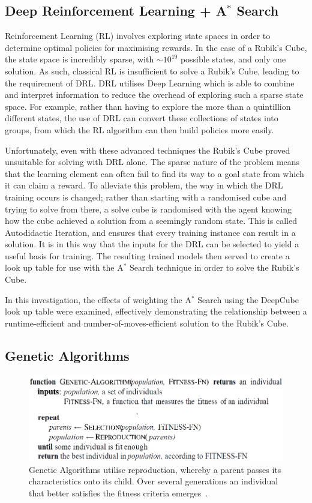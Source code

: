 \documentclass[UKenglish]{svproc}
\begin{document}
\subsection{Deep Reinforcement Learning + A$^{\ast}$ Search}
Reinforcement Learning (RL) involves exploring state spaces in order to determine optimal policies for maximising rewards. In the case of a Rubik's Cube, the state space is incredibly sparse, with $\sim 10^{19}$ possible states, and only one solution. As such, classical RL is insufficient to solve a Rubik's Cube, leading to the requirement of DRL. DRL utilises Deep Learning which is able to combine and interpret information to reduce the overhead of exploring such a sparse state space. For example, rather than having to explore the more than a quintillion different states, the use of DRL can convert these collections of states into groups, from which the RL algorithm can then build policies more easily. \par Unfortunately, even with these advanced techniques the Rubik's Cube proved unsuitable for solving with DRL alone. The sparse nature of the problem means that the learning element can often fail to find its way to a goal state from which it can claim a reward. To alleviate this problem, the way in which the DRL training occurs is changed; rather than starting with a randomised cube and trying to solve from there, a solve cube is randomised with the agent knowing how the cube achieved a solution from a seemingly random state. This is called Autodidactic Iteration, and ensures that every training instance can result in a solution. It is in this way that the inputs for the DRL can be selected to yield a useful basis for training. The resulting trained models then served to create a look up table for use with the A$^{\ast}$ Search technique in order to solve the Rubik's Cube. \par In this investigation, the effects of weighting the A$^{\ast}$ Search using the DeepCube look up table were examined, effectively demonstrating the relationship between a runtime-efficient and number-of-moves-efficient solution to the Rubik's Cube.

\subsection{Genetic Algorithms}

\begin{figure}[!h]
\begin{small}
\centering
\linespread{1.0}
\includegraphics[width=0.75\linewidth]{images/genetic algorithm}
\caption{Genetic Algorithms utilise reproduction, whereby a parent passes its characteristics onto its child. Over several generations an individual that better satisfies the fitness criteria emerges~\cite{10.5555/1671238}.}
\label{fig:fig0}
\end{small}
\end{figure}
\end{document}
